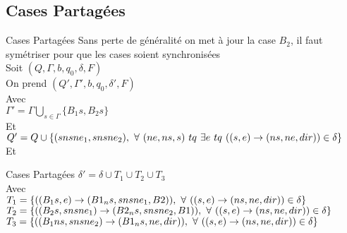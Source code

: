 \documentclass[12pt]{beamer}
\begin{document}
\subsection{Cases Partagées}
\begin{frame}{Cases Partagées}
    Sans perte de généralité on met à jour la case $B_2$, il faut symétriser pour que les cases soient synchronisées\\
    Soit $(Q, \Gamma, b, q_0, \delta, F)$\\
    On prend $(Q', \Gamma', b, q_0, \delta', F)$\\
    Avec\\
    $\Gamma' = \Gamma \bigcup\limits_{s\in\Gamma} \{B_1s, B_2s\}$\\
    Et\\
    $Q' = Q \cup \{(snsne_1,snsne_2),\hspace{0.125cm}\forall \hspace{0.125cm} (ne,ns,s) \hspace{0.125cm} tq \hspace{0.125cm} \exists e \hspace{0.125cm} tq  \hspace{0.125cm} ((s,e)\rightarrow(ns,ne,dir)) \in \delta\} $ \\
    Et\\
\end{frame}
\begin{frame}{Cases Partagées}
    $\delta' = \delta \cup T_1 \cup T_2 \cup T_3$\\
    Avec\\
    $T_1 = \{((B_1s,e)\rightarrow(B1_ns,snsne_1,B2)),\hspace{0.125cm}
    \forall \hspace{0.125cm} ((s,e)\rightarrow(ns,ne,dir)) \in \delta\}$\\
    $T_2 = \{((B_2s,snsne_1)\rightarrow(B2_ns,snsne_2,B1)),\hspace{0.125cm}
    \forall \hspace{0.125cm} ((s,e)\rightarrow(ns,ne,dir)) \in \delta\}$\\
    $T_3 = \{((B_1ns,snsne_2)\rightarrow(B1_ns,ne,dir)),\hspace{0.125cm}
    \forall \hspace{0.125cm} ((s,e)\rightarrow(ns,ne,dir)) \in \delta\}$\\
\end{frame}
\end{document}
